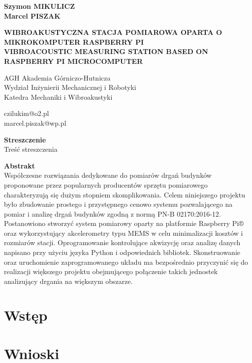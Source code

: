 \documentclass[a4paper,12pt]{mwart}
\begin{document}
    \onehalfspacing
    \begin{flushleft}

        \textbf{Szymon \MakeUppercase{Mikulicz}} \\
        \textbf{Marcel \MakeUppercase{Piszak}} \\
        \vspace*{12pt}

        \MakeUppercase{\textbf{Wibroakustyczna stacja pomiarowa oparta o mikrokomputer Raspberry Pi}} \\
        \vspace*{6pt}
        \MakeUppercase{\textbf{Vibroacoustic measuring station based on Raspberry Pi microcomputer}} \\
        \vspace*{12pt}

        AGH Akademia Górniczo-Hutnicza \\
        Wydział Inżynierii Mechanicznej i Robotyki \\
        Katedra Mechaniki i Wibroakustyki \\
        \vspace*{6pt}

        czilukim@o2.pl \\
        marcel.piszak@wp.pl \\

    \end{flushleft}

        \noindent
        \textbf{Streszczenie} \\
        Treść streszczenia
        \vspace*{24pt}

        \noindent
        \textbf{Abstrakt} \\
        Współczesne rozwiązania dedykowane do pomiarów drgań budynków proponowane przez popularnych producentów sprzętu pomiarowego charakteryzują się dużym stopniem skomplikowania. Celem niniejszego projektu było zbudowanie prostego i przystępnego cenowo systemu pozwalającego na pomiar i analizę drgań budynków zgodną z normą PN-B 02170:2016-12. Postanowiono stworzyć system pomiarowy oparty na platformie Raspberry Pi® oraz wykorzystujący akcelerometry typu MEMS w celu minimalizacji kosztów i rozmiarów stacji. Oprogramowanie kontrolujące akwizycję oraz analizę danych napisano przy użyciu języka Python i odpowiednich bibliotek. Skonstruowanie oraz uruchomienie zaprogramowanego układu ma bezpośrednio przyczynić się do realizacji większego projektu obejmującego połączenie takich jednostek analizujący drgania na większym obszarze.
        \vspace*{24pt}


   

    \section{Wstęp}

    \section{}

    \section{Wnioski}
\end{document}
